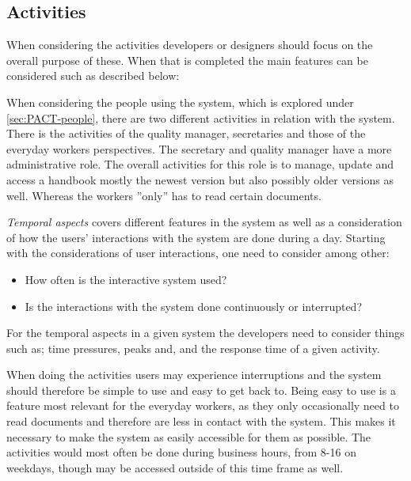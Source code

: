 \subsection{Activities}\label{sec:PACT-actvities}
When considering the activities developers or designers should focus on the overall purpose of these.
When that is completed the main features can be considered such as described below:

When considering the people using the system, which is explored under \cref{sec:PACT-people}, there are two different activities in relation with the system.
There is the activities of the quality manager, secretaries and those of the everyday workers perspectives.
The secretary and quality manager have a more administrative role.
The overall activities for this role is to manage, update and access a handbook mostly the newest version but also possibly older versions as well.
Whereas the workers ''only'' has to read certain documents.

\textit{Temporal aspects} covers different features in the system as well as a consideration of how the users' interactions with the system are done during a day.
Starting with the considerations of user interactions, one need to consider among other:

\begin{itemize}
	\item How often is the interactive system used?
	\item Is the interactions with the system done continuously or interrupted?
\end{itemize}

For the temporal aspects in a given system the developers need to consider things such as; time pressures, peaks and, and the response time of a given activity.

When doing the activities users may experience interruptions and the system should therefore be simple to use and easy to get back to.
Being easy to use is a feature most relevant for the everyday workers, as they only occasionally need to read documents and therefore are less in contact with the system.
This makes it necessary to make the system as easily accessible for them as possible.
The activities would most often be done during business hours, from 8-16 on weekdays, though may be accessed outside of this time frame as well.

